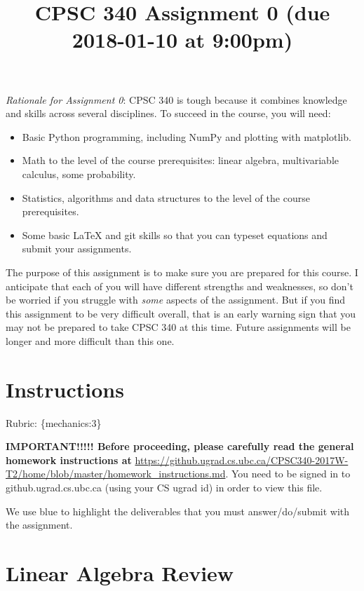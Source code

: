 \documentclass{article}
\def\rubric#1{\gre{Rubric: \{#1\}}}{}
\def\blu#1{{\color{blu}#1}}
\def\gre#1{{\color{gre}#1}}
\begin{document}
\title{CPSC 340 Assignment 0 (due 2018-01-10 at 9:00pm)}
\date{}
\maketitle

\vspace{-4em}

\emph{Rationale for Assignment 0}: CPSC 340 is tough because it combines knowledge and skills across several disciplines. To succeed
in the course, you will need:
\begin{itemize}
\item Basic Python programming, including NumPy and plotting with matplotlib.
\item Math to the level of the course prerequisites: linear algebra, multivariable calculus, some probability.
\item Statistics, algorithms and data structures to the level of the course prerequisites.
\item Some basic LaTeX and git skills so that you can typeset equations and submit your assignments.
\end{itemize}

The purpose of this assignment is to make sure you are prepared for this course. I anticipate that each
of you will have different strengths and weaknesses, so don't be worried if you struggle with \emph{some} aspects
of the assignment. But if you find this assignment
to be very difficult overall, that is an early warning sign that you may not be prepared to take CPSC 340
at this time. Future assignments will be longer and more difficult than this one.


\section*{Instructions}
\rubric{mechanics:3}

\textbf{IMPORTANT!!!!! Before proceeding, please carefully read the general homework instructions at} \url{https://github.ugrad.cs.ubc.ca/CPSC340-2017W-T2/home/blob/master/homework_instructions.md}.
You need to be signed in to github.ugrad.cs.ubc.ca (using your CS ugrad id) in order to view this file. 


\vspace{1em}
We use \blu{blue} to highlight the deliverables that you must answer/do/submit with the assignment.



\section{Linear Algebra Review}
\end{document}
